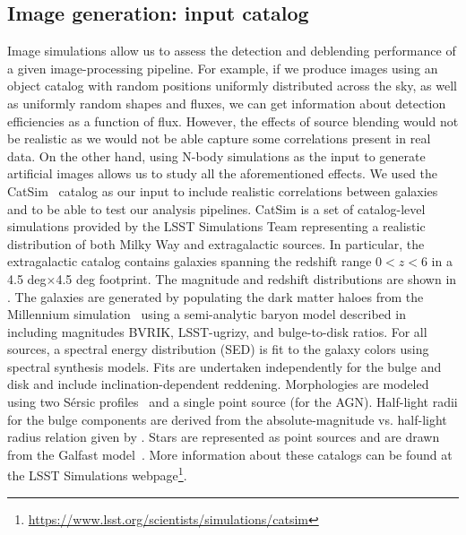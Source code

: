 \documentclass[\docopts]{\docclass}
\begin{document}
\subsection{Image generation: input catalog}
\label{sec:inputs}
Image simulations allow us to assess the detection and deblending performance of a given image-processing pipeline. For example, if we produce images using an object catalog with random positions uniformly distributed across the sky, as well as uniformly random shapes and fluxes, we can get information about detection efficiencies as a function of flux. However, the effects of source blending would not be realistic as we would not be able capture some correlations present in real data. On the other hand, using N-body simulations as the input to generate artificial images allows us to study all the aforementioned effects. We used the CatSim~\citep{2010SPIE.7738E..1OC,2014SPIE.9150E..14C} catalog as our input to include realistic correlations between galaxies and to be able to test our analysis pipelines. CatSim is a set of catalog-level simulations provided by the LSST Simulations Team representing a realistic distribution of both Milky Way and extragalactic sources. In particular, the extragalactic catalog contains galaxies spanning the redshift range $0 < z < 6$ in a 4.5 deg$\times$4.5 deg footprint. The magnitude and redshift distributions are shown in . The galaxies are generated by populating the dark matter haloes from the Millennium simulation~\citep{2005Nature.435.629S} using a semi-analytic baryon model described in \citet{2006MNRAS.366..499D} including magnitudes BVRIK, LSST-ugrizy, and bulge-to-disk ratios. For all sources, a spectral energy distribution (SED) is fit to the galaxy colors using \citet{2003MNRAS.344.1000B} spectral synthesis models. Fits are undertaken independently for the bulge and disk and include inclination-dependent reddening. Morphologies are modeled using two S\'{e}rsic profiles~\citep{1963BAAA....6...41S} and a single point source (for the AGN). Half-light radii for the bulge components are derived from the absolute-magnitude vs. half-light radius relation given by \citet{2011A&A...534A...3G}. Stars are represented as point sources and are drawn from the Galfast model~\citep{2008ApJ...673..864J}. More information about these catalogs can be found at the LSST Simulations webpage\footnote{\url{https://www.lsst.org/scientists/simulations/catsim}}.
\end{document}
